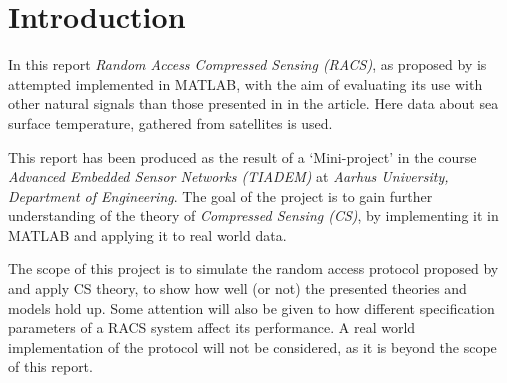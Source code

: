 \documentclass[Main]{subfiles}
\begin{document}
\section{Introduction} %
\label{sec:introduction}
	In this report \emph{Random Access Compressed Sensing (RACS)}, as proposed by \cite{Fazel2011} is attempted implemented in MATLAB, with the aim of evaluating its use with other natural signals than those presented in in the article.
	Here data about sea surface temperature, gathered from satellites is used.

	This report has been produced as the result of a `Mini-project' in the course \emph{Advanced Embedded Sensor Networks (TIADEM)} at \emph{Aarhus University, Department of Engineering}.
	The goal of the project is to gain further understanding of the theory of \emph{Compressed Sensing (CS)}, by implementing it in MATLAB and applying it to real world data.

	The scope of this project is to simulate the random access protocol proposed by \cite{Fazel2011} and apply CS theory, to show how well (or not) the presented theories and models hold up.
	Some attention will also be given to how different specification parameters of a RACS system affect its performance.  
	A real world implementation of the protocol will not be considered, as it is beyond the scope of this report.



\end{document}

